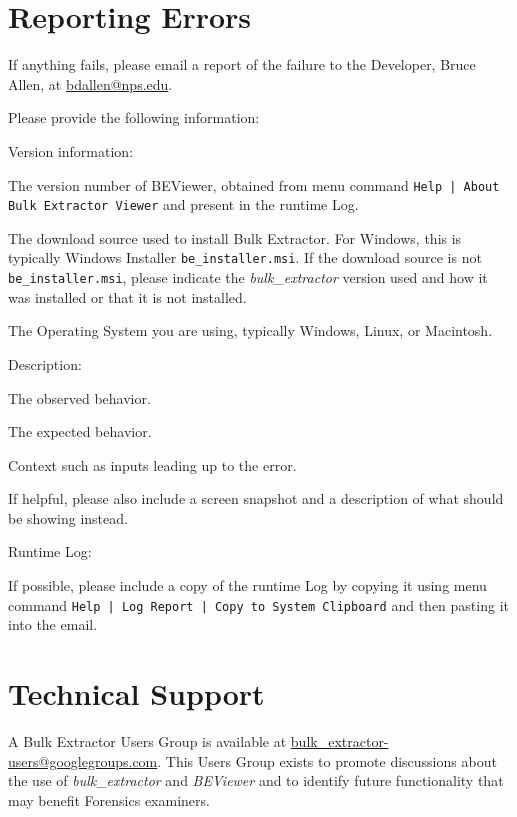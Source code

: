 \documentclass[10pt,twoside]{article}
\newcommand{\bulk}{\emph{bulk\_extractor}\xspace}
\newcommand{\bev}{\emph{BEViewer}\xspace}
\begin{document}
\section{Reporting Errors}
If anything fails, please email a report of the failure
to the Developer, Bruce Allen, at \href{mailto:bdallen@nps.edu}{bdallen@nps.edu}.

Please provide the following information:
\begin{compactitem}
\item Version information:
\begin{compactitem}
\item The version number of BEViewer,
obtained from menu command \texttt{Help | About Bulk Extractor Viewer}
and present in the runtime Log.
\item The download source used to install Bulk Extractor.
For Windows, this is typically Windows Installer \texttt{be\_installer.msi}.
If the download source is not \texttt{be\_installer.msi},
please indicate the \bulk version used and how it was installed
or that it is not installed.
\item The Operating System you are using, typically Windows, Linux, or Macintosh.
\end{compactitem}

\item Description:
\begin{compactitem}
\item The observed behavior.
\item The expected behavior.
\item Context such as inputs leading up to the error.
\item If helpful, please also include a screen snapshot
and a description of what should be showing instead.
\end{compactitem}

\item Runtime Log:
\begin{compactitem}
\item If possible, please include a copy of the runtime Log
by copying it
using menu command \texttt{Help | Log Report | Copy to System Clipboard}
and then pasting it into the email.
\end{compactitem}
\end{compactitem}
 
\section{Technical Support}
A Bulk Extractor Users Group is available at \url{bulk\_extractor-users@googlegroups.com}.
This Users Group exists to promote discussions about the use of \bulk and \bev
and to identify future functionality that may benefit Forensics examiners.
\end{document}

